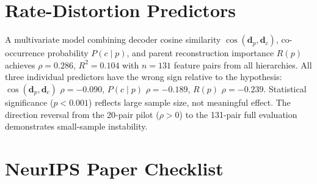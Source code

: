 \documentclass{article}
\begin{document}
\section{Rate-Distortion Predictors}
\label{app:ratedistortion}

A multivariate model combining decoder cosine similarity $\cos(\mathbf{d}_p, \mathbf{d}_c)$, co-occurrence probability $P(c \mid p)$, and parent reconstruction importance $R(p)$ achieves $\rho = 0.286$, $R^2 = 0.104$ with $n = 131$ feature pairs from all hierarchies. All three individual predictors have the wrong sign relative to the hypothesis: $\cos(\mathbf{d}_p, \mathbf{d}_c)$ $\rho = -0.090$, $P(c \mid p)$ $\rho = -0.189$, $R(p)$ $\rho = -0.239$. Statistical significance ($p < 0.001$) reflects large sample size, not meaningful effect. The direction reversal from the 20-pair pilot ($\rho > 0$) to the 131-pair full evaluation demonstrates small-sample instability.

\newpage
\section*{NeurIPS Paper Checklist}
\end{document}
